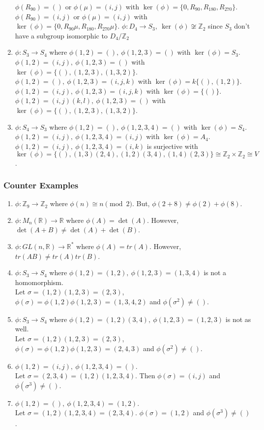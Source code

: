 \begin{enumerate}
		\subitem $\phi(R_{90}) =()$ or $\phi(\mu) =(i,j)$ with $\ker(\phi) = \{ 0,R_{90},R_{180},R_{270} \}$.
		\subitem $\phi(R_{90}) =(i,j)$ or $\phi(\mu) =(i,j)$ with $\ker(\phi) = \{ 0,R_{90}\mu,R_{180},R_{270}\mu \}$.
		\subitem $\phi : D_4 \to S_3,\ \ker(\phi) \not\cong \mathbb{Z}_2$ since $S_3$ don't have a subgroup isomorphic to $D_4/\mathbb{Z}_2$
	\item $\phi : S_3 \to S_4$ where
		\subitem $\phi(1,2)=(),\ \phi(1,2,3)= () $ with $\ker(\phi) = S_3$.
		\subitem $\phi(1,2)=(i,j),\ \phi(1,2,3)= () $ with $\ker(\phi) = \{ (),(1,2,3),(1,3,2) \}$.
		\subitem $\phi(1,2)=(),\ \phi(1,2,3)= (i,j,k) $ with $\ker(\phi) =k \{ (),(1,2) \} $.
		\subitem $\phi(1,2)=(i,j),\ \phi(1,2,3)= (i,j,k) $ with $\ker(\phi) = \{ () \} $.
		\subitem $\phi(1,2)=(i,j)(k,l),\ \phi(1,2,3)= () $ with $\ker(\phi) = \{(),(1,2,3),(1,3,2)\} $.
	\item $\phi : S_4 \to S_3$ where
		\subitem $\phi(1,2)=(),\ \phi(1,2,3,4)= () $ with $\ker(\phi) = S_4$.
		\subitem $\phi(1,2)=(i,j),\ \phi(1,2,3,4)= (i,j) $ with $\ker(\phi) = A_4$.
		\subitem $\phi(1,2)=(i,j),\ \phi(1,2,3,4)= (i,k) $ is surjective with \\$\ker(\phi) = \{ (), (1,3)(2,4), (1,2)(3,4), (1,4)(2,3) \} \cong \mathbb{Z}_2 \times \mathbb{Z}_2 \cong V$.
\end{enumerate}

\subsubsection{Counter Examples}
\begin{enumerate}
	\item $\phi : \mathbb{Z}_9 \to \mathbb{Z}_2$ where $\phi(n) \cong n \pmod{2}$. But, $\phi(2+8) \ne \phi(2)+\phi(8)$.
	\item $\phi : M_n(\mathbb{R}) \to \mathbb{R}$ where $\phi(A) = \det(A)$. However, $\det(A+B) \ne \det(A) + \det(B)$.
	\item $\phi : GL(n,\mathbb{R}) \to \mathbb{R}^\ast$ where $\phi(A) = tr(A)$. However, $tr(AB) \ne tr(A) tr(B)$.
	\item $\phi : S_3 \to S_4$ where $\phi(1,2)=(1,2),\ \phi(1,2,3)= (1,3,4)$ is not a homomorphism.\\ Let $\sigma = (1,2)(1,2,3) = (2,3)$, $\phi(\sigma) = \phi(1,2)\phi(1,2,3)=(1,3,4,2)$ and $\phi(\sigma^2) \ne ()$.
	\item $\phi : S_3 \to S_4$ where $\phi(1,2)=(1,2)(3,4),\ \phi(1,2,3)= (1,2,3)$ is not as well.\\ Let $\sigma = (1,2)(1,2,3) = (2,3)$, $\phi(\sigma) = \phi(1,2)\phi(1,2,3)=(2,4,3)$ and $\phi(\sigma^2) \ne ()$.
	\item $\phi(1,2)=(i,j),\ \phi(1,2,3,4)= () $.\\
	Let $\sigma = (2,3,4) = (1,2)(1,2,3,4)$. Then $\phi(\sigma)=(i,j)$ and $\phi(\sigma^3) \ne ()$.
	\item $\phi(1,2)=(),\ \phi(1,2,3,4)= (1,2)$.\\
	Let $\sigma = (1,2)(1,2,3,4) = (2,3,4)$. $\phi(\sigma) = (1,2)$ and $\phi(\sigma^3) \ne ()$.
\end{enumerate}

